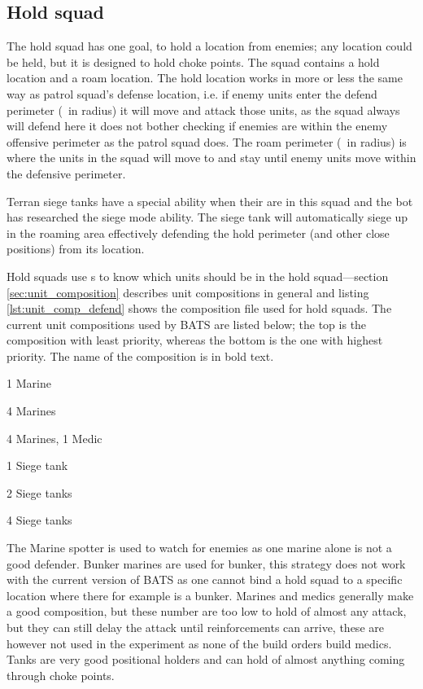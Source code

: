 \subsection{Hold squad}
\label{sec:hold_squad}
The hold squad has one goal, to hold a location from enemies; any location could be held, but it is designed to hold choke points. The squad contains a hold location and a roam location. The hold location works in more or less the same way as patrol squad's defense location, i.e. if enemy units enter the defend perimeter (\squadDefendDefendPerimeter~in radius) it will move and attack those units, as the squad always will defend here it does not bother checking if enemies are within the enemy offensive perimeter as the patrol squad does. The roam perimeter (\squadDefendRoamPerimeter~in radius) is where the units in the squad will move to and stay until enemy units move within the defensive perimeter.

Terran siege tanks have a special ability when their are in this squad and the bot has researched the siege mode ability. The siege tank will automatically siege up in the roaming area effectively defending the hold perimeter (and other close positions) from its location.

Hold squads use s to know which units should be in the hold squad—section \ref{sec:unit_composition} describes unit compositions in general and listing \ref{lst:unit_comp_defend} shows the composition file used for hold squads. The current unit compositions used by BATS are listed below; the top is the composition with least priority, whereas the bottom is the one with highest priority. The name of the composition is in bold text.

\begin{function_description}
	\item[Marine spotter] 1 Marine
	\item[Bunker Marines] 4 Marines
	\item[Marine Medics] 4 Marines, 1 Medic
	\item[Tanks 1] 1 Siege tank
	\item[Tanks 2] 2 Siege tanks
	\item[Tanks 4] 4 Siege tanks
\end{function_description}
The Marine spotter is used to watch for enemies as one marine alone is not a good defender. Bunker marines are used for bunker, this strategy does not work with the current version of BATS as one cannot bind a hold squad to a specific location where there for example is a bunker. Marines and medics generally make a good composition, but these number are too low to hold of almost any attack, but they can still delay the attack until reinforcements can arrive, these are however not used in the experiment as none of the build orders build medics. Tanks are very good positional holders and can hold of almost anything coming through choke points\cite{day9}.


